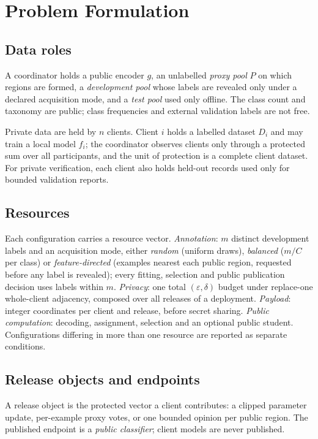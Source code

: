 \section{Problem Formulation}
\label{sec:problem}

\subsection{Data roles}

A coordinator holds a public encoder $g$, an unlabelled \emph{proxy pool}
$P$ on which regions are formed, a \emph{development pool} whose labels are
revealed only under a declared acquisition mode, and a \emph{test pool}
used only offline. The class count and taxonomy are public; class
frequencies and external validation labels are not free.

Private data are held by $n$ clients. Client $i$ holds a labelled dataset
$D_i$ and may train a local model $f_i$; the coordinator observes clients
only through a protected sum over all participants, and the unit of
protection is a complete client dataset. For private verification, each
client also holds held-out records used only for bounded validation reports.

\subsection{Resources}

Each configuration carries a resource vector. \emph{Annotation}: $m$
distinct development labels and an acquisition mode, either \emph{random}
(uniform draws), \emph{balanced} ($m/C$ per class) or
\emph{feature-directed} (examples nearest each public region, requested
before any label is revealed); every fitting, selection and public
publication decision uses labels within $m$. \emph{Privacy}: one total
$(\varepsilon,\delta)$ budget under replace-one whole-client adjacency,
composed over all releases of a deployment. \emph{Payload}: integer
coordinates per client and release, before secret sharing.
\emph{Public computation}: decoding, assignment, selection and an optional
public student. Configurations differing in more than one resource are
reported as separate conditions.

\subsection{Release objects and endpoints}

A release object is the protected vector a client contributes: a clipped
parameter update, per-example proxy votes, or one bounded opinion per public
region. The published endpoint is a \emph{public classifier}; client models
are never published.

